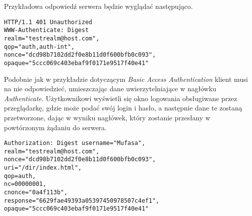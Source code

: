 \documentclass[11pt]{aghdpl}
\begin{document}
Przykładowa odpowiedź serwera będzie wyglądać następująco.
\begin{lstlisting}
HTTP/1.1 401 Unauthorized
WWW-Authenticate: Digest
realm="testrealm@host.com",
qop="auth,auth-int",
nonce="dcd98b7102dd2f0e8b11d0f600bfb0c093",
opaque="5ccc069c403ebaf9f0171e9517f40e41"
\end{lstlisting}

Podobnie jak w przykładzie dotyczącym \emph{Basic Access Authentication} klient musi na nie odpowiedzieć, umieszczając dane uwierzytelniające w nagłówku \emph{Authenticate}. Użytkownikowi wyświetli się okno logowania obsługiwane przez przeglądarkę, gdzie może podać swój login i hasło, a następnie dane te zostaną przetworzone, dając w wyniku nagłówek, który zostanie przesłany w powtórzonym żądaniu do serwera.
\begin{lstlisting}
Authorization: Digest username="Mufasa",
realm="testrealm@host.com",
nonce="dcd98b7102dd2f0e8b11d0f600bfb0c093",
uri="/dir/index.html",
qop=auth,
nc=00000001,
cnonce="0a4f113b",
response="6629fae49393a05397450978507c4ef1",
opaque="5ccc069c403ebaf9f0171e9517f40e41"
\end{lstlisting}
\end{document}
